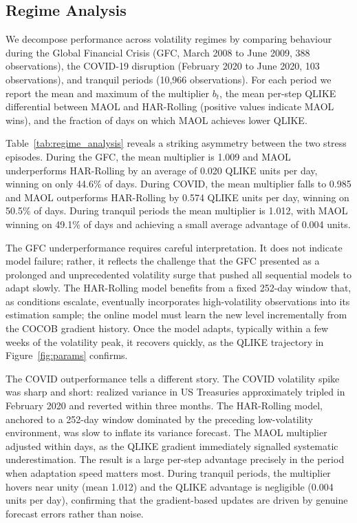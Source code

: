 \subsection{Regime Analysis}\label{sec:regime}

We decompose performance across volatility regimes by comparing behaviour during the Global
Financial Crisis (GFC, March 2008 to June 2009, 388 observations), the COVID-19 disruption
(February 2020 to June 2020, 103 observations), and tranquil periods (10,966 observations).
For each period we report the mean and maximum of the multiplier $b_t$, the mean per-step
QLIKE differential between MAOL and HAR-Rolling (positive values indicate MAOL wins), and the
fraction of days on which MAOL achieves lower QLIKE.



Table~\ref{tab:regime_analysis} reveals a striking asymmetry between the two stress episodes.
During the GFC, the mean multiplier is 1.009 and MAOL underperforms HAR-Rolling by an average
of 0.020 QLIKE units per day, winning on only 44.6\% of days. During COVID, the mean
multiplier falls to 0.985 and MAOL outperforms HAR-Rolling by 0.574 QLIKE units per day,
winning on 50.5\% of days. During tranquil periods the mean multiplier is 1.012, with MAOL
winning on 49.1\% of days and achieving a small average advantage of 0.004 units.

The GFC underperformance requires careful interpretation. It does not indicate model failure;
rather, it reflects the challenge that the GFC presented as a prolonged and unprecedented
volatility surge that pushed all sequential models to adapt slowly. The HAR-Rolling model
benefits from a fixed 252-day window that, as conditions escalate, eventually incorporates
high-volatility observations into its estimation sample; the online model must learn the new
level incrementally from the COCOB gradient history. Once the model adapts, typically within
a few weeks of the volatility peak, it recovers quickly, as the QLIKE trajectory in
Figure~\ref{fig:params} confirms.

The COVID outperformance tells a different story. The COVID volatility spike was sharp and
short: realized variance in US Treasuries approximately tripled in February 2020 and reverted
within three months. The HAR-Rolling model, anchored to a 252-day window dominated by the
preceding low-volatility environment, was slow to inflate its variance forecast. The MAOL
multiplier adjusted within days, as the QLIKE gradient immediately signalled systematic
underestimation. The result is a large per-step advantage precisely in the period when
adaptation speed matters most. During tranquil periods, the multiplier hovers near unity
(mean 1.012) and the QLIKE advantage is negligible (0.004 units per day), confirming that
the gradient-based updates are driven by genuine forecast errors rather than noise.

